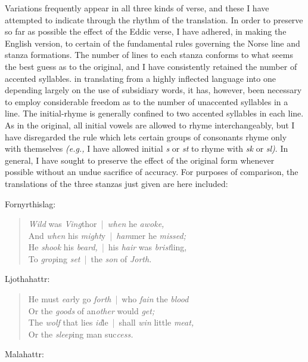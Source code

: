 \documentclass{scrbook}
\newcommand{\sep}{\textcolor{gray}{~|~}}
\begin{document}
Variations frequently appear in all three kinds of verse, and these I have attempted to indicate through the rhythm of the translation. In order to preserve so far as possible the effect of the Eddic verse, I have adhered, in making the English version, to certain of the fundamental rules governing the Norse line and stanza formations. The number of lines to each stanza conforms to what seems the best guess as to the original, and I have consistently retained the number of accented syllables. in translating from a highly inflected language into one depending largely on the use of subsidiary words, it has, however, been necessary to employ considerable freedom as to the number of unaccented syllables in a line. The initial-rhyme is generally confined to two accented syllables in each line. As in the original, all initial vowels are allowed to rhyme interchangeably, but I have disregarded the rule which lets certain groups of consonants rhyme only with themselves \emph{(e.g.,} I have allowed initial \emph{s} or \emph{st} to rhyme with \emph{sk} or \emph{sl)}. In general, I have sought to preserve the effect of the original form whenever possible without an undue sacrifice of accuracy. For purposes of comparison, the translations of the three stanzas just given are here included:

Fornyrthislag:

\begin{verse}
\textit{Wild} was \textit{Ving}thor{\sep}\textit{when} he \textit{awoke,} \\
And \textit{when} his \textit{might}y{\sep}\textit{ham}mer he \textit{missed;} \\
He \textit{shook} his \textit{beard,}{\sep}his \textit{hair} was \textit{brist}ling, \\
To \textit{grop}ing \textit{set}{\sep}the \textit{son} of \textit{Jorth.}
\end{verse}

Ljothahattr:

\begin{verse}
He must \textit{ear}ly go \textit{forth}{\sep}who \textit{fain} the \textit{blood} \\
Or the \textit{goods} of an\textit{other} would \textit{get;} \\
The \textit{wolf} that lies \textit{id}le{\sep}shall \textit{win} little \textit{meat,} \\
Or the \textit{sleep}ing man suc\textit{cess.}
\end{verse}

Malahattr:
\end{document}
